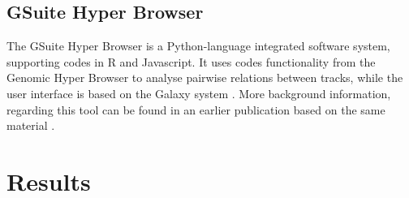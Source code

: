 \documentclass{bioinfo}
\begin{document}
\begin{methods}
\subsection{GSuite Hyper Browser}
The GSuite Hyper Browser is a Python-language integrated software system, supporting codes in R and Javascript. It uses codes functionality from the Genomic Hyper Browser \cite{sandve2010genomic} to analyse pairwise relations between tracks, while the user interface is based on the Galaxy system \cite{goecks2010galaxy}. 
More background information, regarding this tool can be found in an earlier publication based on the same material \cite{simovski2017gsuite}. 

\end{methods}


\section{Results}
















\end{document}
